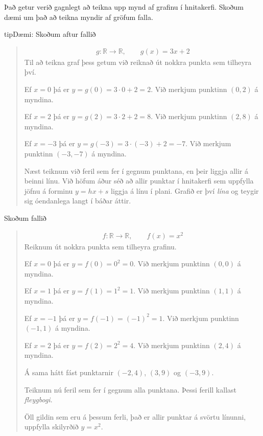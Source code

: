 \documentclass[a4paper,10pt,icelandic]{sphinxmanual}
\begin{document}
Það getur verið gagnlegt að teikna upp mynd af grafinu í hnitakerfi. Skoðum dæmi um það að teikna myndir af gröfum falla.

\begin{sphinxadmonition}{tip}{Dæmi:}
 Skoðum aftur fallið
\begin{quote}
\begin{equation*}
\begin{split}g: \mathbb{R} \to \mathbb{R}, \qquad g(x)=3x+2\end{split}
\end{equation*}
Til að teikna graf þess getum við reiknað út nokkra punkta sem tilheyra því.

Ef \(x=0\) þá er \(y=g(0)=3 \cdot 0+2=2\). Við merkjum punktinn \((0,2)\) á myndina.

Ef \(x=2\) þá er \(y=g(2)=3 \cdot 2 +2=8\). Við merkjum punktinn \((2,8)\) á myndina.

Ef \(x=-3\) þá er \(y=g(-3)= 3 \cdot (-3)+2=-7\). Við merkjum punktinn \((-3,-7)\) á myndina.

Næst teiknum við feril sem fer í gegnum punktana, en þeir liggja allir á beinni línu. Við höfum áður séð að allir punktar í hnitakerfi sem uppfylla jöfnu á forminu \(y=hx+s\) liggja á línu í plani. Grafið er því \textit{lína} og teygir sig óendanlega langt í báðar áttir.

\end{quote}

 Skoðum fallið
\begin{quote}
\begin{equation*}
\begin{split}f: \mathbb{R} \to \mathbb{R}, \qquad f(x)=x^2\end{split}
\end{equation*}
Reiknum út nokkra punkta sem tilheyra grafinu.

Ef \(x=0\) þá er \(y=f(0)=0^2=0\). Við merkjum punktinn \((0,0)\) á myndina.

Ef \(x=1\) þá er \(y=f(1)= 1^2=1\). Við merkjum punktinn \((1,1)\) á myndina.

Ef \(x=-1\) þá er \(y=f(-1)= (-1)^2=1\). Við merkjum punktinn \((-1,1)\) á myndina.

Ef \(x=2\) þá er \(y=f(2)= 2^2=4\). Við merkjum punktinn \((2,4)\) á myndina.

Á sama hátt fást punktarnir \((-2,4)\), \((3,9)\) og \((-3,9)\).

Teiknum nú feril sem fer í gegnum alla punktana. Þessi ferill kallast \textit{fleygbogi}.


Öll gildin sem eru á þessum ferli, það er allir punktar á svörtu línunni, uppfylla skilyrðið \(y=x^2\).
\end{quote}
\end{sphinxadmonition}
\end{document}
